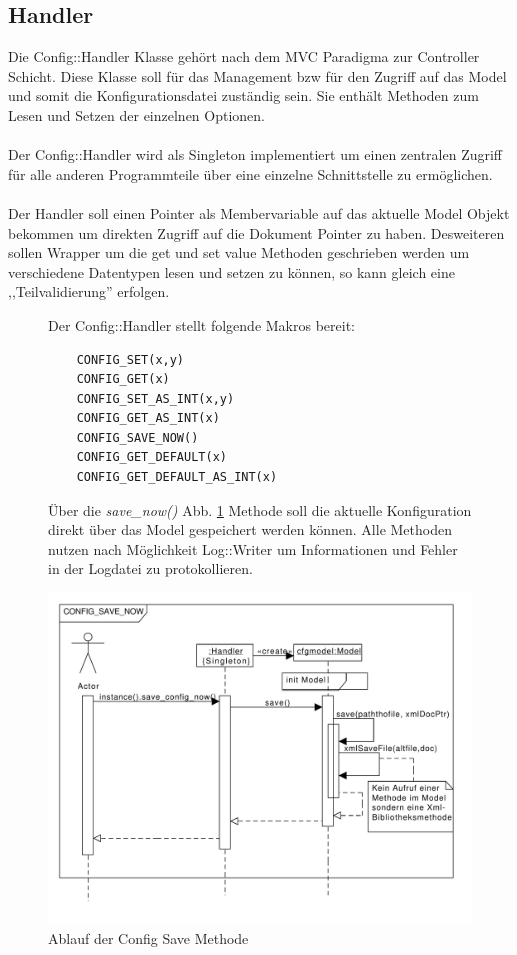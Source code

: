 \subsection{Handler}
Die Config::Handler Klasse gehört nach dem MVC Paradigma zur Controller Schicht. Diese Klasse soll für das Management bzw für den
Zugriff auf das Model und somit die Konfigurationsdatei zuständig sein. Sie enthält Methoden zum Lesen und Setzen der einzelnen Optionen.
\\
\\
Der Config::Handler wird als Singleton implementiert um einen zentralen Zugriff für alle anderen Programmteile über eine einzelne Schnittstelle zu ermöglichen.
\\
\\
Der Handler soll einen Pointer als Membervariable auf das aktuelle Model Objekt bekommen um direkten Zugriff auf die Dokument Pointer
zu haben. Desweiteren sollen Wrapper um die get und set value Methoden geschrieben werden um verschiedene Datentypen lesen und setzen zu können, so kann gleich eine ,,Teilvalidierung'' erfolgen.

\begin{figure}[htb!]
    Der Config::Handler stellt folgende Makros bereit:
    \begin{verbatim}
    CONFIG_SET(x,y) 
    CONFIG_GET(x)   
    CONFIG_SET_AS_INT(x,y) 
    CONFIG_GET_AS_INT(x)   
    CONFIG_SAVE_NOW() 
    CONFIG_GET_DEFAULT(x)
    CONFIG_GET_DEFAULT_AS_INT(x)
    \end{verbatim}
\end{figure}

\begin{figure}[htb!]
Über die \emph{save\_now()} Abb. \ref{c_configsave} Methode soll die aktuelle Konfiguration direkt über das Model gespeichert werden können.
Alle Methoden nutzen nach Möglichkeit Log::Writer um Informationen und Fehler in der Logdatei zu protokollieren.


    \centering
    \includegraphics[width=\textwidth]{./gfx/seq/config_save}
    \caption{Ablauf der Config Save Methode}
    \label{c_configsave}
\end{figure}

